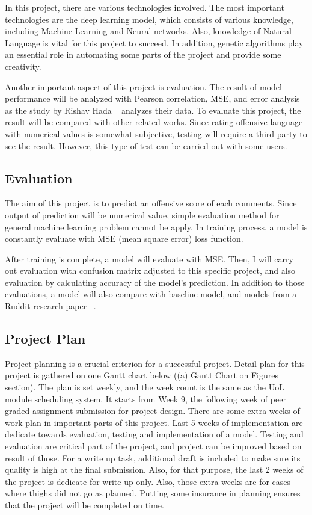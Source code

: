 \documentclass[11pt, natbib=false]{article}
\begin{document}
\begin{multicols}{2}
In this project, there are various technologies involved.
The most important technologies are the deep learning model, which consists of various knowledge, including Machine Learning and Neural networks.
Also, knowledge of Natural Language is vital for this project to succeed.
In addition, genetic algorithms play an essential role in automating some parts of the project and provide some creativity.

Another important aspect of this project is evaluation.
The result of model performance will be analyzed with Pearson correlation, MSE, and error analysis as the study by Rishav Hada ~\cite{hada2021ruddit} analyzes their data.
To evaluate this project, the result will be compared with other related works.
Since rating offensive language with numerical values is somewhat subjective, testing will require a third party to see the result.
However, this type of test can be carried out with some users. 

\subsection{Evaluation}
The aim of this project is to predict an offensive score of each comments.
Since output of prediction will be numerical value, simple evaluation method for general machine learning problem cannot be apply.
In training process, a model is constantly evaluate with MSE (mean square error) loss function.

After training is complete, a model will evaluate with MSE.
Then, I will carry out evaluation with confusion matrix adjusted to this specific project, and also evaluation by calculating accuracy of the model’s prediction.
In addition to those evaluations, a model will also compare with baseline model, and models from a Ruddit research paper ~\cite{hada2021ruddit}.


\subsection{Project Plan}
Project planning is a crucial criterion for a successful project. Detail plan for this project is gathered on one Gantt chart below ((a) Gantt Chart on Figures section).
The plan is set weekly, and the week count is the same as the UoL module scheduling system.
It starts from Week 9, the following week of peer graded assignment submission for project design.
There are some extra weeks of work plan in important parts of this project.
Last 5 weeks of implementation are dedicate towards evaluation, testing and implementation of a model.
Testing and evaluation are critical part of the project, and project can be improved based on result of those.
For a write up task, additional draft is included to make sure its quality is high at the final submission.
Also, for that purpose, the last 2 weeks of the project is dedicate for write up only.
Also, those extra weeks are for cases where thighs did not go as planned.
Putting some insurance in planning ensures that the project will be completed on time. \\


\end{multicols}
\end{document}
